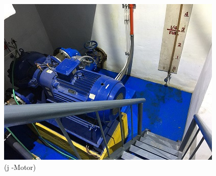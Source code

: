 \begin{figure}
\begin{minipage}[b]{0.22\linewidth}
	\includegraphics[width=\textwidth]{figures/R1P_visual/motor1}
	\caption*{(j -Motor)}
\end{minipage}
	\hspace{0.03cm}
\begin{minipage}[b]{0.22\linewidth}

\end{minipage}
\end{figure}
